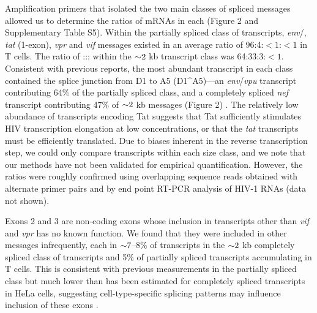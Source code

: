 \documentclass[../sherrill-Mix_thesis.tex]{subfiles}
\begin{document}
Amplification primers that isolated the two main classes of spliced messages allowed us to determine the ratios of mRNAs in each (Figure 2 and Supplementary Table S5). Within the partially spliced class of transcripts, \textit{env}/, \textit{tat} (1-exon), \textit{vpr} and \textit{vif} messages existed in an average ratio of 96:4:$<1$:$<1$ in \cdFour{} T cells. The ratio of ::: within the $\mathord{\sim}{}2$ kb transcript class was 64:33:3:$<1$. Consistent with previous reports, the most abundant transcript in each class contained the splice junction from D1 to A5 (D1\^{}A5)---an \textit{env}/\textit{vpu} transcript contributing 64\% of the partially spliced class, and a completely spliced \textit{nef} transcript contributing 47\% of $\mathord{\sim}{}2$ kb messages (Figure 2) \citep{Purcell1993,Guatelli1990}. The relatively low abundance of transcripts encoding Tat suggests that Tat sufficiently stimulates HIV transcription elongation at low concentrations, or that the \textit{tat} transcripts must be efficiently translated. Due to biases inherent in the reverse transcription step, we could only compare transcripts within each size class, and we note that our methods have not been validated for empirical quantification. However, the ratios were roughly confirmed using overlapping sequence reads obtained with alternate primer pairs and by end point RT-PCR analysis of HIV-1 RNAs (data not shown).

Exons 2 and 3 are non-coding exons whose inclusion in transcripts other than \textit{vif} and \textit{vpr} has no known function. We found that they were included in other messages infrequently, each in $\mathord{\sim}{}7$--8\% of transcripts in the $\mathord{\sim}{}2$ kb completely spliced class of transcripts and 5\% of partially spliced transcripts accumulating in T cells. This is consistent with previous measurements in the partially spliced class but much lower than has been estimated for completely spliced transcripts in HeLa cells, suggesting cell-type-specific splicing patterns may influence inclusion of these exons \citep{Purcell1993}. 
\end{document}
